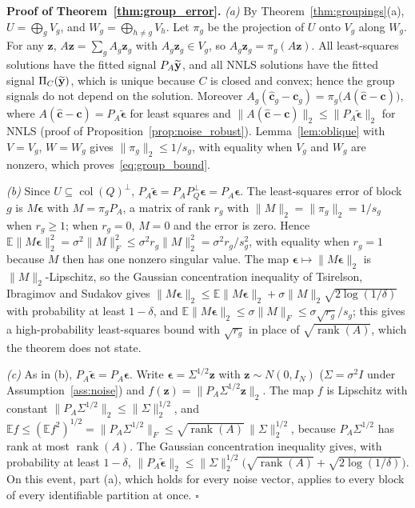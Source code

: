 \noindent\textbf{Proof of Theorem~\ref{thm:group_error}.}
\emph{(a)}  By Theorem~\ref{thm:groupings}(a), \(U=\bigoplus_{g}V_g\), and
\(W_g=\bigoplus_{h\ne g}V_h\).  Let \(\pi_g\) be the projection of \(U\) onto
\(V_g\) along \(W_g\).  For any \(\mathbf z\),
\(A\mathbf z=\sum_gA_g\mathbf z_g\) with \(A_g\mathbf z_g\in V_g\), so
\(A_g\mathbf z_g=\pi_g(A\mathbf z)\).  All least-squares solutions have the fitted
signal \(P_A\widetilde{\mathbf y}\), and all NNLS solutions have the fitted signal \(\Pi_C(\widetilde{\mathbf y})\),
which is unique because \(C\) is closed and convex; hence the group signals do not
depend on the solution.  Moreover
\(A_g(\widehat{\mathbf c}_g-\mathbf c_g)=\pi_g\bigl(A(\widehat{\mathbf c}-\mathbf c)\bigr)\),
where \(A(\widehat{\mathbf c}-\mathbf c)=P_A\widetilde{\boldsymbol\epsilon}\) for
least squares and \(\|A(\widehat{\mathbf c}-\mathbf c)\|_2\le
\|P_A\widetilde{\boldsymbol\epsilon}\|_2\) for NNLS (proof of
Proposition~\ref{prop:noise_robust}).  Lemma~\ref{lem:oblique} with \(V=V_g\),
\(W=W_g\) gives \(\|\pi_g\|_2\le1/s_g\), with equality when \(V_g\) and \(W_g\) are
nonzero, which proves~\eqref{eq:group_bound}.

\emph{(b)}  Since \(U\subseteq\operatorname{col}(Q)^\perp\),
\(P_A\widetilde{\boldsymbol\epsilon}=P_AP_Q^\perp\boldsymbol\epsilon
=P_A\boldsymbol\epsilon\).  The least-squares error of block \(g\) is
\(M\boldsymbol\epsilon\) with \(M=\pi_gP_A\), a matrix of rank \(r_g\) with
\(\|M\|_2=\|\pi_g\|_2=1/s_g\) when \(r_g\ge1\); when \(r_g=0\), \(M=0\) and the
error is zero.  Hence
\(\mathbb E\|M\boldsymbol\epsilon\|_2^2=\sigma^2\|M\|_F^2\le\sigma^2r_g\|M\|_2^2
=\sigma^2r_g/s_g^2\), with equality when \(r_g=1\) because \(M\) then has one nonzero
singular value.  The map \(\boldsymbol\epsilon\mapsto\|M\boldsymbol\epsilon\|_2\) is
\(\|M\|_2\)-Lipschitz, so the Gaussian concentration inequality of
Tsirelson, Ibragimov and Sudakov \citep{boucheron2013concentration} gives
\(\|M\boldsymbol\epsilon\|_2\le\mathbb E\|M\boldsymbol\epsilon\|_2
+\sigma\|M\|_2\sqrt{2\log(1/\delta)}\) with probability at least \(1-\delta\), and
\(\mathbb E\|M\boldsymbol\epsilon\|_2\le\sigma\|M\|_F\le\sigma\sqrt{r_g}/s_g\); this gives a
high-probability least-squares bound with \(\sqrt{r_g}\) in place of
\(\sqrt{\operatorname{rank}(A)}\), which the theorem does not state.

\emph{(c)}  As in (b), \(P_A\widetilde{\boldsymbol\epsilon}=P_A\boldsymbol\epsilon\).
Write \(\boldsymbol\epsilon=\Sigma^{1/2}\mathbf z\) with \(\mathbf z\sim N(0,I_N)\)
(\(\Sigma=\sigma^2I\) under Assumption~\ref{ass:noise}) and
\(f(\mathbf z)=\|P_A\Sigma^{1/2}\mathbf z\|_2\).  The map \(f\) is Lipschitz with
constant \(\|P_A\Sigma^{1/2}\|_2\le\|\Sigma\|_2^{1/2}\), and
\(\mathbb Ef\le(\mathbb Ef^2)^{1/2}=\|P_A\Sigma^{1/2}\|_F
\le\sqrt{\operatorname{rank}(A)}\,\|\Sigma\|_2^{1/2}\), because
\(P_A\Sigma^{1/2}\) has rank at most \(\operatorname{rank}(A)\).  The Gaussian
concentration inequality \citep{boucheron2013concentration} gives, with probability at
least \(1-\delta\),
\(\|P_A\widetilde{\boldsymbol\epsilon}\|_2\le\|\Sigma\|_2^{1/2}
\bigl(\sqrt{\operatorname{rank}(A)}+\sqrt{2\log(1/\delta)}\bigr)\).  On this event,
part (a), which holds for every noise vector, applies to every block of every
identifiable partition at once.  \(\square\)

